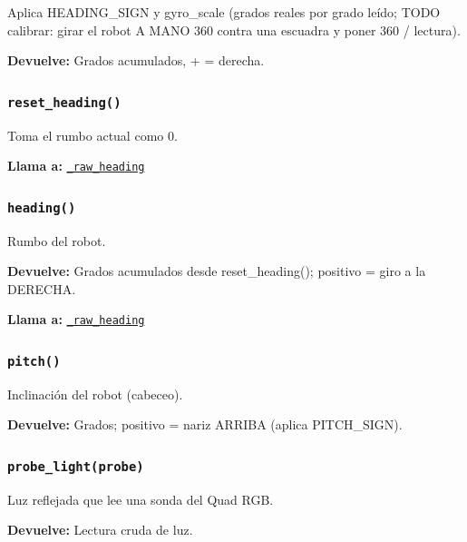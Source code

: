 Aplica HEADING\_SIGN y gyro\_scale (grados reales por grado leído; TODO calibrar: girar el robot A MANO 360\textdegree{} contra una escuadra y poner 360 / lectura).

\noindent\textbf{Devuelve:} Grados acumulados, + = derecha.\par

\subsubsection{\texttt{reset\_\allowbreak{}heading()}}\label{fn:hal:reset-heading}
\noindent Toma el rumbo actual como 0.

\noindent\textbf{Llama a:} \hyperref[fn:hal:-raw-heading]{\texttt{\_\allowbreak{}raw\_\allowbreak{}heading}}\par

\subsubsection{\texttt{heading()}}\label{fn:hal:heading}
\noindent Rumbo del robot.

\noindent\textbf{Devuelve:} Grados acumulados desde reset\_heading(); positivo = giro a la DERECHA.\par
\noindent\textbf{Llama a:} \hyperref[fn:hal:-raw-heading]{\texttt{\_\allowbreak{}raw\_\allowbreak{}heading}}\par

\subsubsection{\texttt{pitch()}}\label{fn:hal:pitch}
\noindent Inclinación del robot (cabeceo).

\noindent\textbf{Devuelve:} Grados; positivo = nariz ARRIBA (aplica PITCH\_SIGN).\par

\subsubsection{\texttt{probe\_\allowbreak{}light(probe)}}\label{fn:hal:probe-light}
\noindent Luz reflejada que lee una sonda del Quad RGB.

\par{}\par\smallskip
\noindent\textbf{Devuelve:} Lectura cruda de luz.\par

